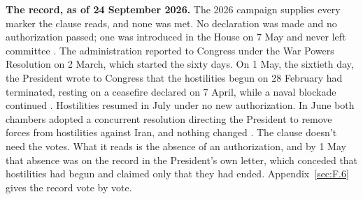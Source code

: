 \begin{esbox}
\textbf{The record, as of 24 September 2026.} The 2026 campaign supplies every marker the clause reads, and none was met. No declaration was made and no authorization passed; one was introduced in the House on 7 May and never left committee \autocite{hjres176}. The administration reported to Congress under the War Powers Resolution on 2 March, which started the sixty days. On 1 May, the sixtieth day, the President wrote to Congress that the hostilities begun on 28 February had terminated, resting on a ceasefire declared on 7 April, while a naval blockade continued \autocite{cbs2026terminated,lawfare2026sixtydays}. Hostilities resumed in July under no new authorization. In June both chambers adopted a concurrent resolution directing the President to remove forces from hostilities against Iran, and nothing changed \autocite{hconres86,asil2026iranwpr}. The clause doesn't need the votes. What it reads is the absence of an authorization, and by 1 May that absence was on the record in the President's own letter, which conceded that hostilities had begun and claimed only that they had ended. Appendix~\ref{sec:F.6} gives the record vote by vote.
\end{esbox}
